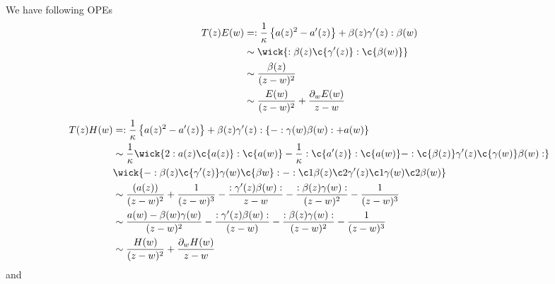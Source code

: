 \subsubsection{}
We have following OPEs
\begin{equation}
	\begin{split}
	T(z)E(w) & = : \frac{1}{\kappa}\left\{a(z)^2 - a'(z)  \right\} + \beta(z)\gamma'(z): \beta(w)\\
	& \sim \wick{: \beta(z) \c{\gamma^{\prime}(z)}: \c{\beta(w)} }\\
	& \sim \frac{\beta(z)}{(z-w)^2}\\
	& \sim \frac{E(w)}{(z-w)^2} + \frac{\partial_w E(w)}{z-w}\\
	\end{split}
\end{equation}
\begin{equation}
\begin{split}
T(z)H(w) &= : \frac{1}{\kappa} \left\{ a(z)^2 - a'(z) \right\} + \beta(z) \gamma'(z) : \left\{- : \gamma(w)\beta(w): + a(w) \right\}\\
& \sim \frac{1}{\kappa}\wick{2: a(z)\c{a(z)}: \c{a(w)}- \frac{1}{\kappa}: \c{a'(z)}: \c{a(w)}- : \c{\beta(z)}\gamma'(z) \c{\gamma(w)} \beta(w): }\\
& \wick{- : \beta(z) \c{\gamma'(z)} \gamma(w) \c{\beta{w}}: - : \c1{\beta(z)} \c2{\gamma'(z)} \c1{\gamma(w)} \c2{\beta(w)} }\\
& \sim \frac{(a(z))}{(z-w)^2} + \frac{1}{(z-w)^3} - \frac{:\gamma'(z) \beta(w):}{z-w} - \frac{:\beta(z) \gamma(w):}{(z-w)^2} - \frac{1}{(z-w)^3} \\
& \sim \frac{a(w) - \beta(w)\gamma(w)}{(z-w)^2} - \frac{:\gamma'(z)\beta(w):}{(z-w)} - \frac{:\beta(z)\gamma(w):}{(z-w)^2} - \frac{1}{(z-w)^3} \\
& \sim \frac{H(w)}{(z-w)^2} + \frac{\partial_wH(w)}{z-w}\\
\end{split}
\end{equation}
and 
